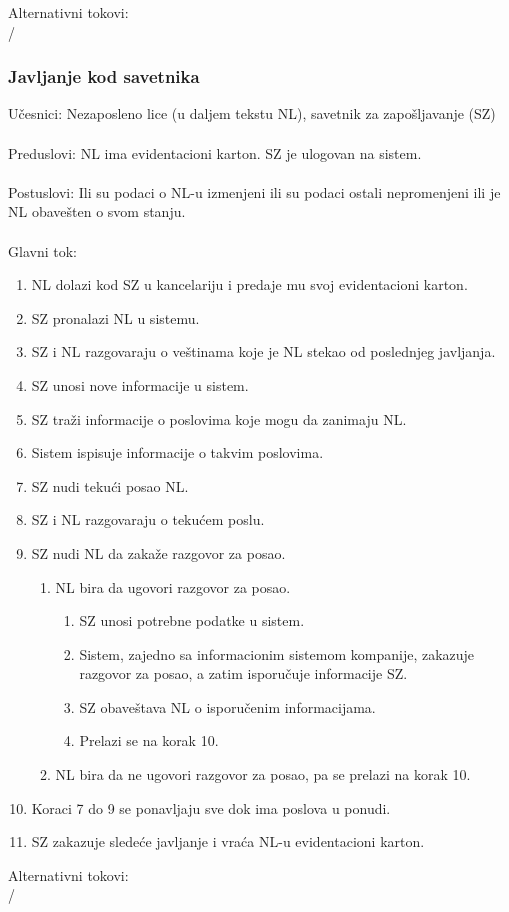 \noindent Alternativni tokovi: 
\\/

\subsubsection{Javljanje kod savetnika}
\label{su: javljanje kod savetnika}

\noindent U\v cesnici: Nezaposleno lice (u daljem tekstu NL), savetnik za zapo\v sljavanje (SZ)
\\
\\ Preduslovi: NL ima evidentacioni karton. SZ je ulogovan na sistem. 
\\
\\ Postuslovi: Ili su podaci o NL-u izmenjeni ili su podaci ostali nepromenjeni ili je NL obave\v sten o svom stanju.
\\ 
\\ Glavni tok:
\begin{enumerate}
	\item NL dolazi kod SZ u kancelariju i predaje mu svoj evidentacioni karton.
	\item SZ pronalazi NL u sistemu.
	\item SZ i NL razgovaraju o ve\v stinama koje je NL stekao od poslednjeg javljanja.
	\item SZ unosi nove informacije u sistem.
	\item SZ tra\v zi informacije o poslovima koje mogu da zanimaju NL.
	\item Sistem ispisuje informacije o takvim poslovima. 
	\item SZ nudi teku\' ci posao NL.
	\item SZ i NL razgovaraju o teku\' cem poslu.
	\item SZ nudi NL da zaka\v ze razgovor za posao.
	\begin{enumerate}
		\item NL bira da ugovori razgovor za posao.
		\begin{enumerate}
			\item SZ unosi potrebne podatke u sistem.
			\item Sistem, zajedno sa informacionim sistemom kompanije, zakazuje razgovor za posao, a zatim isporu\v cuje informacije SZ.
			\item SZ obave\v stava NL o isporu\v cenim informacijama.
			\item Prelazi se na korak 10.
		\end{enumerate}
		\item NL bira da ne ugovori razgovor za posao, pa se prelazi na korak 10.
	\end{enumerate}
	\item Koraci 7 do 9 se ponavljaju sve dok ima poslova u ponudi.
	\item SZ zakazuje slede\' ce javljanje i vra\' ca NL-u evidentacioni karton.
\end{enumerate}

\noindent Alternativni tokovi: 
\\/
